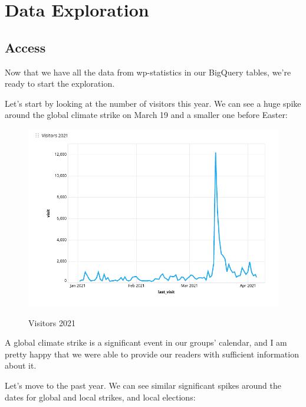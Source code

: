 %
%

\pagebreak
\section{Data Exploration}

\onehalfspacing

\subsection{Access}

Now that we have all the data from wp-statistics in our BigQuery tables, we're ready to start the exploration. 

Let's start by looking at the number of visitors this year. We can see a huge spike around the global climate strike on March 19 and a smaller one before Easter:

\begin{figure}[H]
\centering
\caption {Visitors 2021}
\includegraphics[width=\linewidth]{images/figure01.png}
\label{fig:visitors2021}
\end{figure}

A global climate strike is a significant event in our groups' calendar, and I am pretty happy that we were able to provide our readers with sufficient information about it.

Let's move to the past year. We can see similar significant spikes around the dates for global and local strikes, and local elections:

